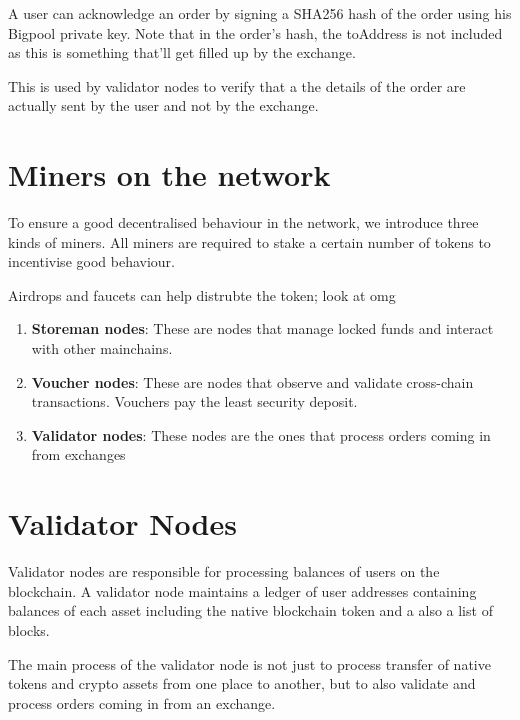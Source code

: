 \documentclass{Bigpool}
\begin{document}
A user can acknowledge an order by signing a SHA256 hash of the order using his Bigpool private key. Note that in the order’s hash, the toAddress is not included as this is something that’ll get filled up by the exchange.

This is used by validator nodes to verify that a the details of the order are actually sent by the user and not by the exchange.



\section{Miners on the network}
To ensure a good decentralised behaviour in the network, we introduce three kinds of miners. All miners are required to stake a certain number of tokens to incentivise good behaviour. 

Airdrops and faucets can help distrubte the token; look at omg
\begin{enumerate}
	\item \textbf{Storeman nodes}: These are nodes that manage locked funds and interact with other mainchains.
	\item \textbf{Voucher nodes}: These are nodes that observe and validate cross-chain transactions. Vouchers pay the least security deposit.
	\item \textbf{Validator nodes}: These nodes are the ones that process orders coming in from exchanges
\end{enumerate}


\section{Validator Nodes}
Validator nodes are responsible for processing balances of users on the blockchain. A validator node maintains a ledger of user addresses containing balances of each asset including the native blockchain token and a also a list of blocks. 

The main process of the validator node is not just to process transfer of native tokens  and crypto assets from one place to another, but to also validate and  process orders coming in from an exchange.
\end{document}

